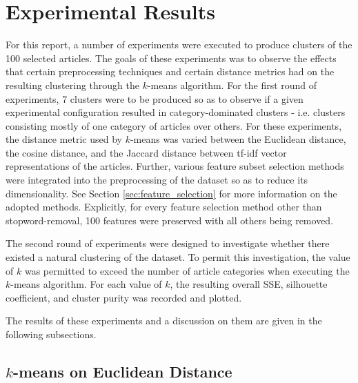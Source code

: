 \documentclass[11pt]{article}
\begin{document}
\section{Experimental Results}

For this report, a number of experiments were executed to produce clusters of the 100 selected articles.
The goals of these experiments was to observe the effects that certain preprocessing techniques and certain distance metrics had on the resulting clustering through the $k$-means algorithm.
For the first round of experiments, 7 clusters were to be produced so as to observe if a given experimental configuration resulted in category-dominated clusters - i.e. clusters consisting mostly of one category of articles over others.
For these experiments, the distance metric used by $k$-means was varied between the Euclidean distance, the cosine distance, and the Jaccard distance between tf-idf vector representations of the articles.
Further, various feature subset selection methods were integrated into the preprocessing of the dataset so as to reduce its dimensionality.
See Section \ref{sec:feature_selection} for more information on the adopted methods.
Explicitly, for every feature selection method other than stopword-removal, 100 features were preserved with all others being removed.

The second round of experiments were designed to investigate whether there existed a natural clustering of the dataset.
To permit this investigation, the value of $k$ was permitted to exceed the number of article categories when executing the $k$-means algorithm.
For each value of $k$, the resulting overall SSE, silhouette coefficient, and cluster purity was recorded and plotted.

The results of these experiments and a discussion on them are given in the following subsections.


\subsection{$k$-means on Euclidean Distance} \label{sec:euclid}
\end{document}
